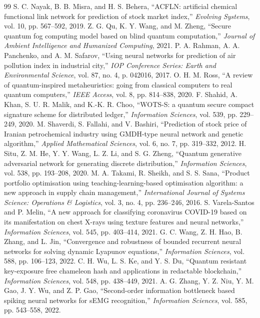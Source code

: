 \documentclass[conference]{IEEEtran}
\begin{document}
\begin{thebibliography}{99}
 S. C. Nayak, B. B. Misra, and H. S. Behera, ``ACFLN: artificial chemical functional link network for prediction of stock market index,'' \emph{Evolving Systems}, vol. 10, pp. 567--592, 2019.
 Z. G. Qu, K. Y. Wang, and M. Zheng, ``Secure quantum fog computing model based on blind quantum computation,'' \emph{Journal of Ambient Intelligence and Humanized Computing}, 2021.
 P. A. Rahman, A. A. Panchenko, and A. M. Safarov, ``Using neural networks for prediction of air pollution index in industrial city,'' \emph{IOP Conference Series: Earth and Environmental Science}, vol. 87, no. 4, p. 042016, 2017.
 O. H. M. Ross, ``A review of quantum-inspired metaheuristics: going from classical computers to real quantum computers,'' \emph{IEEE Access}, vol. 8, pp. 814--838, 2020.
 F. Shahid, A. Khan, S. U. R. Malik, and K.-K. R. Choo, ``WOTS-S: a quantum secure compact signature scheme for distributed ledger,'' \emph{Information Sciences}, vol. 539, pp. 229--249, 2020.
 M. Shaverdi, S. Fallahi, and V. Bashiri, ``Prediction of stock price of Iranian petrochemical industry using GMDH-type neural network and genetic algorithm,'' \emph{Applied Mathematical Sciences}, vol. 6, no. 7, pp. 319--332, 2012.
 H. Situ, Z. M. He, Y. Y. Wang, L. Z. Li, and S. G. Zheng, ``Quantum generative adversarial network for generating discrete distribution,'' \emph{Information Sciences}, vol. 538, pp. 193--208, 2020.
 M. A. Takami, R. Sheikh, and S. S. Sana, ``Product portfolio optimisation using teaching-learning-based optimisation algorithm: a new approach in supply chain management,'' \emph{International Journal of Systems Science: Operations \& Logistics}, vol. 3, no. 4, pp. 236--246, 2016.
 S. Varela-Santos and P. Melin, ``A new approach for classifying coronavirus COVID-19 based on its manifestation on chest X-rays using texture features and neural networks,'' \emph{Information Sciences}, vol. 545, pp. 403--414, 2021.
 G. C. Wang, Z. H. Hao, B. Zhang, and L. Jin, ``Convergence and robustness of bounded recurrent neural networks for solving dynamic Lyapunov equations,'' \emph{Information Sciences}, vol. 588, pp. 106--123, 2022.
 C. H. Wu, L. S. Ke, and Y. S. Du, ``Quantum resistant key-exposure free chameleon hash and applications in redactable blockchain,'' \emph{Information Sciences}, vol. 548, pp. 438--449, 2021.
 A. G. Zhang, Y. Z. Niu, Y. M. Gao, J. Y. Wu, and Z. P. Gao, ``Second-order information bottleneck based spiking neural networks for sEMG recognition,'' \emph{Information Sciences}, vol. 585, pp. 543--558, 2022.

\end{thebibliography}
\end{document}
